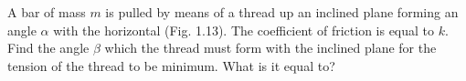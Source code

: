\item A bar of mass \( m \) is pulled by means of a thread up an inclined plane forming an angle \( \alpha \) with the horizontal (Fig. 1.13). The coefficient of friction is equal to \( k \). Find the angle \( \beta \) which the thread must form with the inclined plane for the tension of the thread to be minimum. What is it equal to?
    \begin{center}
    \end{center}